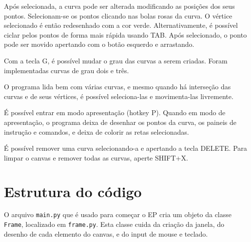 \documentclass[12pt]{article}
\theoremstyle{plain}
\numberwithin{equation}{section}
\newcommand{\code}[1]{\lstinline[mathescape=true]{#1}}
\begin{document}
\begin{figure}[h]
  \centering{}
\end{figure}

Após selecionada, a curva pode ser alterada modificando as posições dos seus pontos. Selecionam-se
os pontos clicando nas bolas rosas da curva. O vértice selecionado é então redesenhado com a cor
verde. Alternativamente, é possível ciclar pelos pontos de forma mais rápida usando TAB. Após
selecionado, o ponto pode ser movido apertando com o botão esquerdo e arrastando.

\begin{figure}[h]
  \centering{}
\end{figure}

Com a tecla G, é possível mudar o grau das curvas a serem criadas. Foram implementadas curvas de
grau dois e três.

\begin{figure}[h]
  \centering{}
\end{figure}

O programa lida bem com várias curvas, e mesmo quando há interseção das curvas e de seus vértices,
é possível seleciona-las e movimenta-las livremente.

\begin{figure}[h]
  \centering{}
\end{figure}

É possível entrar em modo apresentação (hotkey P). Quando em modo de apresentação, o programa deixa
de desenhar os pontos da curva, os paineis de instrução e comandos, e deixa de colorir as retas
selecionadas.

\begin{figure}[h]
  \centering{}
\end{figure}

É possível remover uma curva selecionando-a e apertando a tecla DELETE. Para limpar o canvas e
remover todas as curvas, aperte SHIFT+X.

\section{Estrutura do código}

O arquivo \code{main.py} que é usado para começar o EP cria um objeto da classe \code{Frame},
localizado em \code{frame.py}. Esta classe cuida da criação da janela, do desenho de cada elemento
do canvas, e do input de mouse e teclado.
\end{document}
